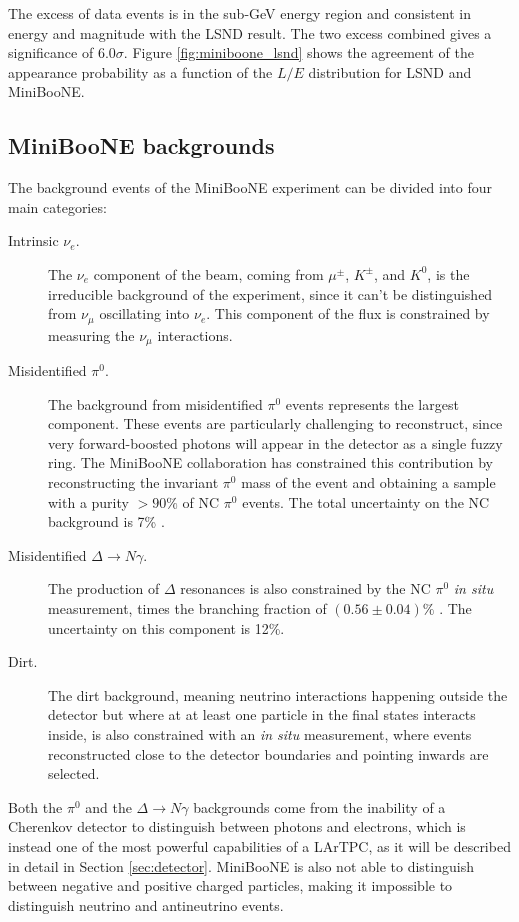 The excess of data events is in the sub-GeV energy region and consistent in energy and magnitude with the LSND result. The two excess combined gives a significance of $6.0\sigma$. Figure \ref{fig:miniboone_lsnd} shows the agreement of the appearance probability as a function of the $L/E$ distribution for LSND and MiniBooNE. 

\subsection*{MiniBooNE backgrounds}
The background events of the MiniBooNE experiment can be divided into four main categories:
\begin{description}
    \item[Intrinsic $\nu_e$.] The $\nu_e$ component of the beam, coming from $\mu^{\pm}$, $K^{\pm}$, and $K^0$, is the irreducible background of the experiment, since it can't be distinguished from $\nu_{\mu}$ oscillating into $\nu_{e}$. This component of the flux is constrained by measuring the $\nu_{\mu}$ interactions.
    \item[Misidentified $\pi^0$.] The background from misidentified $\pi^0$ events represents the largest component. These events are particularly challenging to reconstruct, since very forward-boosted photons will appear in the detector as a single fuzzy ring. The MiniBooNE collaboration has constrained this contribution by reconstructing the invariant $\pi^0$ mass of the event and obtaining a sample with a purity $>90\%$ of NC $\pi^0$ events. The total uncertainty on the NC background is 7\% \cite{Karagiorgi:2010zz}.
    \item[Misidentified $\Delta\rightarrow N\gamma$.] The production of $\Delta$ resonances is also constrained by the NC $\pi^0$ \emph{in situ} measurement, times the branching fraction of $(0.56\pm0.04)\%$ \cite{PhysRevD.98.030001}. The uncertainty on this component is 12\%.
    \item[Dirt.] The dirt background, meaning neutrino interactions happening outside the detector but where at at least one particle in the final states interacts inside, is also constrained with an \emph{in situ} measurement, where events reconstructed close to the detector boundaries and pointing inwards are selected. 
\end{description}

Both the $\pi^0$ and the $\Delta\to N\gamma$ backgrounds come from the inability of a Cherenkov detector to distinguish between photons and electrons, which is instead one of the most powerful capabilities of a LArTPC, as it will be described in detail in Section \ref{sec:detector}. MiniBooNE is also not able to distinguish between negative and positive charged particles, making it impossible to distinguish neutrino and antineutrino events.

